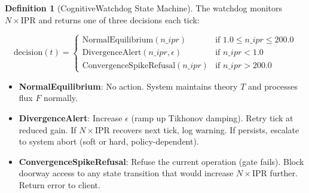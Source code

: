 \documentclass[11pt,oneside]{article}
\theoremstyle{definition}
\newtheorem{definition}[theorem]{Definition}
\begin{document}
\begin{definition}[CognitiveWatchdog State Machine]
The watchdog monitors $N \times \text{IPR}$ and returns one of three decisions each tick:

\[
\text{decision}(t) = \begin{cases}
\text{NormalEquilibrium}(n\_ipr) & \text{if } 1.0 \le n\_ipr \le 200.0 \\
\text{DivergenceAlert}(n\_ipr, \epsilon) & \text{if } n\_ipr < 1.0 \\
\text{ConvergenceSpikeRefusal}(n\_ipr) & \text{if } n\_ipr > 200.0
\end{cases}
\]

\begin{itemize}
  \item \textbf{NormalEquilibrium}: No action. System maintains theory $T$ and processes flux $F$ normally.
  \item \textbf{DivergenceAlert}: Increase $\epsilon$ (ramp up Tikhonov damping). Retry tick at reduced gain. If $N \times \text{IPR}$ recovers next tick, log warning. If persists, escalate to system abort (soft or hard, policy-dependent).
  \item \textbf{ConvergenceSpikeRefusal}: Refuse the current operation (gate fails). Block doorway access to any state transition that would increase $N \times \text{IPR}$ further. Return error to client.
\end{itemize}
\end{definition}
\end{document}
